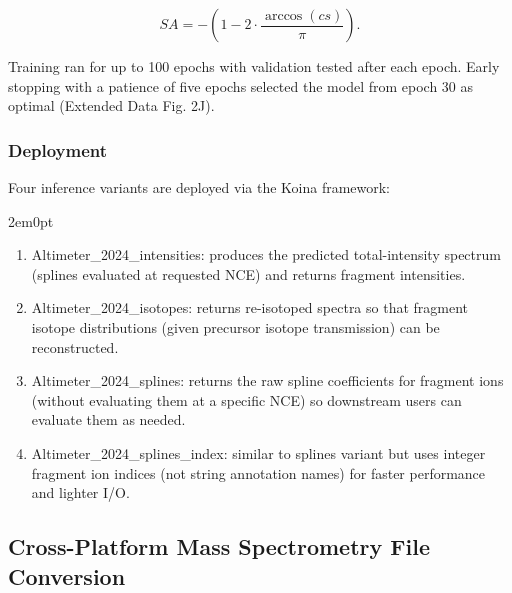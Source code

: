 \documentclass[pdflatex,sn-nature]{sn-jnl}
\begin{document}
\[
SA = -\left(1 - 2 \cdot \frac{\arccos(cs)}{\pi}\right).
\]  

Training ran for up to 100 epochs with validation tested after each epoch. Early stopping with a patience of five epochs selected the model from epoch 30 as optimal (Extended Data Fig. 2J).  

\subsubsection{Deployment}\label{subsubsec:altimeter-deployment}
Four inference variants are deployed via the Koina framework:
\begin{adjustwidth}{2em}{0pt}
    \begin{enumerate}
        \item Altimeter\_2024\_intensities: produces the predicted total-intensity spectrum (splines evaluated at requested NCE) and returns fragment intensities.
        \item Altimeter\_2024\_isotopes: returns re-isotoped spectra so that fragment isotope distributions (given precursor isotope transmission) can be reconstructed.
        \item Altimeter\_2024\_splines: returns the raw spline coefficients for fragment ions (without evaluating them at a specific NCE) so downstream users can evaluate them as needed.
        \item Altimeter\_2024\_splines\_index: similar to splines variant but uses integer fragment ion indices (not string annotation names) for faster performance and lighter I/O.
    \end{enumerate}
\end{adjustwidth}













\subsection{Cross-Platform Mass Spectrometry File Conversion}\label{subsec:file-conversion}
\end{document}
